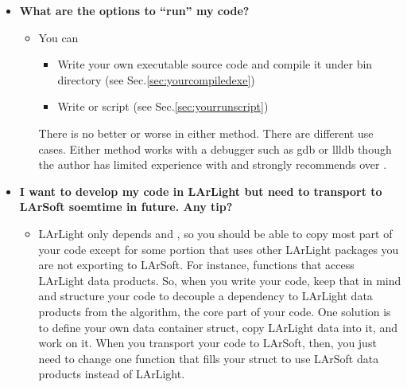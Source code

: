 \begin{itemize}
\item[] {\bf What are the options to ``run'' my code? }
  \begin{itemize}
    \item You can 
      \begin{itemize}
        \item Write your own executable source code and compile it under {\ttfamily bin} directory (see Sec.\ref{sec:yourcompiledexe})
        \item Write \CINT or \PyROOT script (see Sec.\ref{sec:yourrunscript})
      \end{itemize}
      There is no better or worse in either method. There are different use cases. Either method works with a debugger such as {\ttfamily gdb} or {\ttfamily llldb} though the author has limited experience with \CINT and strongly recommends \PyROOT over \CINT.
  \end{itemize}

\item[] {\bf I want to develop my code in LArLight but need to transport to LArSoft soemtime in future. Any tip?}
  \begin{itemize}
    \item LArLight only depends \ROOT and \CPP, so you should be able to copy most part of your code except for some portion that uses other LArLight packages you are not exporting to LArSoft. For instance, functions that access LArLight data products. So, when you write your code, keep that in mind and structure your code to decouple a dependency to LArLight data products from the algorithm, the core part of your code. One solution is to define your own data container \CPP struct, copy LArLight data into it, and work on it. When you transport your code to LArSoft, then, you just need to change one function that fills your \CPP struct to use LArSoft data products instead of LArLight.
  \end{itemize}

\end{itemize}
